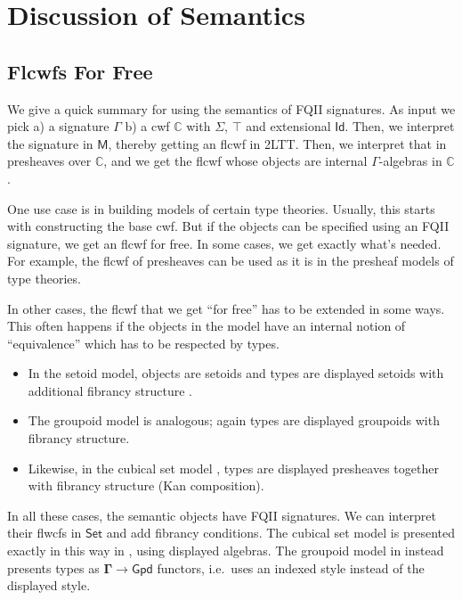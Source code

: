 \documentclass[12pt,a4paper,twoside,openany]{book}
\theoremstyle{remark}
\theoremstyle{definition}
\theoremstyle{theorem}
\newcommand{\ms}[1]{\mathsf{#1}}
\newcommand{\mbb}[1]{\mathbb{#1}}
\newcommand{\bs}[1]{\boldsymbol{#1}}
\newcommand{\Id}{\mathsf{Id}}
\newcommand{\Set}{\mathsf{Set}}
\newcommand{\bM}{\bs{\mathsf{M}}}
\newcommand{\mbbC}{\mbb{C}}
\begin{document}

\section{Discussion of Semantics}

\subsection{Flcwfs For Free}

We give a quick summary for using the semantics of FQII signatures. As input we
pick a) a signature $\Gamma$ b) a cwf $\mbbC$ with $\Sigma$, $\top$ and
extensional $\Id$. Then, we interpret the signature in $\bM$, thereby getting an
flcwf in 2LTT. Then, we interpret that in presheaves over $\mbbC$, and we get
the flcwf whose objects are internal $\Gamma$-algebras in $\mbbC$.

One use case is in building models of certain type theories. Usually, this
starts with constructing the base cwf. But if the objects can be specified using
an FQII signature, we get an flcwf for free. In some cases, we get exactly
what's needed. For example, the flcwf of presheaves can be used as it is in the
presheaf models of type theories.

In other cases, the flcwf that we get ``for free'' has to be extended in some
ways. This often happens if the objects in the model have an internal notion of
``equivalence'' which has to be respected by types.
\begin{itemize}
  \item In the setoid model, objects are setoids and types are displayed
    setoids with additional fibrancy structure \cite{TODO}.
  \item The groupoid model \cite{hofmann96groupoidmodel} is analogous; again types are displayed groupoids
    with fibrancy structure.
  \item Likewise, in the cubical set model \cite{cubical}, types are displayed
    presheaves together with fibrancy structure (Kan composition).
\end{itemize}

In all these cases, the semantic objects have FQII signatures. We can interpret
their flwcfs in $\bs{\Set}$ and add fibrancy conditions. The cubical set model
is presented exactly in this way in \cite{cubical}, using displayed
algebras. The groupoid model in \cite{hofmann96groupoidmodel} instead presents
types as $\bs{\Gamma} \to \bs{\ms{Gpd}}$ functors, i.e.\ uses an indexed style
instead of the displayed style.
\end{document}
